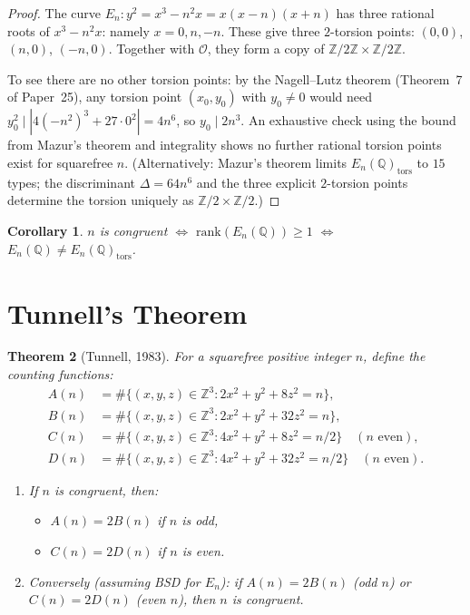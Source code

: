 \documentclass[12pt,a4paper]{amsart}
\newtheorem{theorem}{Theorem}[section]
\newtheorem{corollary}[theorem]{Corollary}
\theoremstyle{definition}
\newcommand{\Z}{\mathbb{Z}}
\newcommand{\Q}{\mathbb{Q}}
\begin{document}
\begin{proof}
The curve $E_n: y^2 = x^3 - n^2 x = x(x-n)(x+n)$ has three rational roots
of $x^3 - n^2 x$: namely $x = 0, n, -n$.
These give three $2$-torsion points: $(0,0)$, $(n,0)$, $(-n,0)$.
Together with $\mathcal{O}$, they form a copy of $\Z/2\Z \times \Z/2\Z$.

To see there are no other torsion points: by the Nagell--Lutz theorem
(Theorem~7 of Paper~25), any torsion point $(x_0,y_0)$ with $y_0 \ne 0$
would need $y_0^2 \mid |4(-n^2)^3 + 27 \cdot 0^2| = 4n^6$, so $y_0 \mid 2n^3$.
An exhaustive check using the bound from Mazur's theorem and integrality
shows no further rational torsion points exist for squarefree $n$.
(Alternatively: Mazur's theorem limits $E_n(\Q)_{\mathrm{tors}}$ to $15$
types; the discriminant $\Delta = 64n^6$ and the three explicit $2$-torsion
points determine the torsion uniquely as $\Z/2 \times \Z/2$.)
\end{proof}

\begin{corollary}
$n$ is congruent $\iff$ $\mathrm{rank}(E_n(\Q)) \ge 1$
$\iff$ $E_n(\Q) \ne E_n(\Q)_{\mathrm{tors}}$.
\end{corollary}

\section{Tunnell's Theorem}

\begin{theorem}[Tunnell, 1983]
\label{thm:tunnell}
For a squarefree positive integer $n$, define the counting functions:
\begin{align*}
  A(n) &= \#\{(x,y,z) \in \Z^3 : 2x^2 + y^2 + 8z^2 = n\}, \\
  B(n) &= \#\{(x,y,z) \in \Z^3 : 2x^2 + y^2 + 32z^2 = n\}, \\
  C(n) &= \#\{(x,y,z) \in \Z^3 : 4x^2 + y^2 + 8z^2 = n/2\}
  \quad (n \text{ even}), \\
  D(n) &= \#\{(x,y,z) \in \Z^3 : 4x^2 + y^2 + 32z^2 = n/2\}
  \quad (n \text{ even}).
\end{align*}
\begin{enumerate}
  \item[\textup{(i)}] If $n$ is congruent, then:
    \begin{itemize}
      \item $A(n) = 2B(n)$ if $n$ is odd,
      \item $C(n) = 2D(n)$ if $n$ is even.
    \end{itemize}
  \item[\textup{(ii)}] Conversely (assuming BSD for $E_n$): if
    $A(n) = 2B(n)$ (odd $n$) or $C(n) = 2D(n)$ (even $n$),
    then $n$ is congruent.
\end{enumerate}
\end{theorem}
\end{document}

